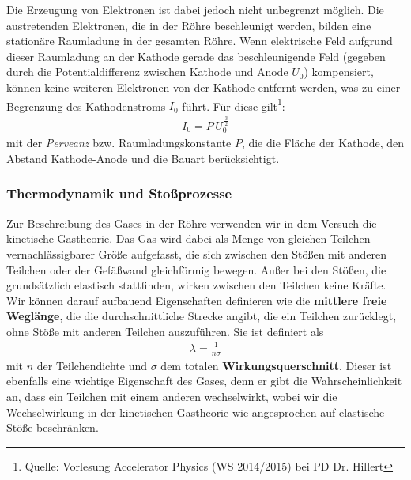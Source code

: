 \documentclass[11pt, a4paper]{article}
\begin{document}
Die Erzeugung von Elektronen ist dabei jedoch nicht unbegrenzt möglich.
Die austretenden Elektronen, die in der Röhre beschleunigt werden, bilden eine stationäre Raumladung in der gesamten Röhre.
Wenn elektrische Feld aufgrund dieser Raumladung an der Kathode gerade das beschleunigende Feld (gegeben durch die Potentialdifferenz zwischen Kathode und Anode $U_0$) kompensiert, können keine weiteren Elektronen von der Kathode entfernt werden, was zu einer Begrenzung des Kathodenstroms $I_0$ führt.
Für diese gilt\footnote{Quelle: Vorlesung Accelerator Physics (WS 2014/2015) bei PD Dr. Hillert}:
\begin{align*}
I_0=P\,U_0^{\,\frac{3}{2}}
\end{align*}
mit der \emph{Perveanz} bzw. Raumladungskonstante $P$, die die Fläche der Kathode, den Abstand Kathode-Anode und die Bauart berücksichtigt.

\subsubsection{Thermodynamik und Stoßprozesse}

Zur Beschreibung des Gases in der Röhre verwenden wir in dem Versuch die kinetische Gastheorie.
Das Gas wird dabei als Menge von gleichen Teilchen vernachlässigbarer Größe aufgefasst, die sich zwischen den Stößen mit anderen Teilchen oder der Gefäßwand gleichförmig bewegen.
Außer bei den Stößen, die grundsätzlich elastisch stattfinden, wirken zwischen den Teilchen keine Kräfte.
Wir können darauf aufbauend Eigenschaften definieren wie die \textbf{mittlere freie Weglänge}, die die durchschnittliche Strecke angibt, die ein Teilchen zurücklegt, ohne Stöße mit anderen Teilchen auszuführen.
Sie ist definiert als
\begin{align}
\lambda=\frac{1}{n\sigma}
\end{align}
mit $n$ der Teilchendichte und $\sigma$ dem totalen \textbf{Wirkungsquerschnitt}.
Dieser ist ebenfalls eine wichtige Eigenschaft des Gases, denn er gibt die Wahrscheinlichkeit an, dass ein Teilchen mit einem anderen wechselwirkt, wobei wir die Wechselwirkung in der kinetischen Gastheorie wie angesprochen auf elastische Stöße beschränken.
\end{document}

